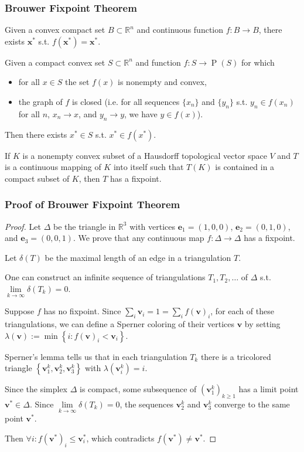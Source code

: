 \documentclass[UTF8,aspectratio=43,11pt,colorlinks,compress,openany]{beamer}%
\begin{document}
\begin{frame}\frametitle{Brouwer Fixpoint Theorem}
\begin{theorem}
Given a convex compact set $B\subset\mathbb{R}^n$ and continuous function $f: B\to B$, there exists $\mathbf{x}^*$ s.t. $f(\mathbf{x}^*)=\mathbf{x}^*$.
\end{theorem}
\begin{theorem}
Given a compact convex set $S\subset\mathbb{R}^n$ and function $f: S\to \operatorname{P}(S)$ for which
\begin{itemize}
	\item for all $x\in S$ the set $f(x)$ is nonempty and convex,
	\item the graph of $f$ is closed (i.e. for all sequences $\{x_n\}$ and $\{y_n\}$ s.t. $y_n\in f(x_n)$ for all $n$, $x_n\to x$, and $y_n\to y$, we have $y\in f(x)$).
\end{itemize}
Then there exists $x^*\in S$ s.t. $x^*\in f(x^*)$.
\end{theorem}
\begin{theorem}
If $K$ is a nonempty convex subset of a Hausdorff topological vector space $V$ and $T$ is a continuous mapping of $K$ into itself such that $T(K)$ is contained in a compact subset of $K$, then $T$ has a fixpoint.
\end{theorem}
\end{frame}

\begin{frame}\frametitle{Proof of Brouwer Fixpoint Theorem}
\begin{proof}
Let $\Delta$ be the triangle in $\mathbb{R}^3$ with vertices $\mathbf{e}_1=(1, 0, 0)$, $\mathbf{e}_2=(0, 1, 0)$, and $\mathbf{e}_3=(0, 0, 1)$. We prove that any continuous map $f:\Delta\to\Delta$ has a fixpoint.

Let $\delta(T)$ be the maximal length of an edge in a triangulation $T$.

One can construct an infinite sequence of triangulations $T_1, T_2,\dots$ of $\Delta$ s.t. $\lim\limits_{k\to\infty}\delta(T_k)=0$.

Suppose $f$ has no fixpoint. Since $\sum_i \mathbf{v}_i=1=\sum_i f(\mathbf{v})_i$, for each of these triangulations, we can define a Sperner coloring of their vertices $\mathbf{v}$ by setting $\lambda(\mathbf{v}):=\min\left\{i: f(\mathbf{v})_i<\mathbf{v}_i\right\}$.

Sperner's lemma tells us that in each triangulation $T_k$ there is a tricolored triangle $\left\{\mathbf{v}_1^k,\mathbf{v}_2^k,\mathbf{v}_3^k\right\}$ with $\lambda(\mathbf{v}_i^k)=i$.

Since the simplex $\Delta$ is compact, some subsequence of $\left(\mathbf{v}_1^k\right)_{k\geq 1}$ has a limit point $\mathbf{v}^*\in\Delta$. Since $\lim\limits_{k\to\infty}\delta(T_k)=0$, the sequences $\mathbf{v}_2^k$ and $\mathbf{v}_3^k$ converge to the same point $\mathbf{v}^*$.

Then $\forall i: f(\mathbf{v}^*)_i\leq\mathbf{v}^*_i$, which contradicts $f(\mathbf{v}^*)\neq\mathbf{v}^*$.
\end{proof}
\end{frame}
\end{document}
